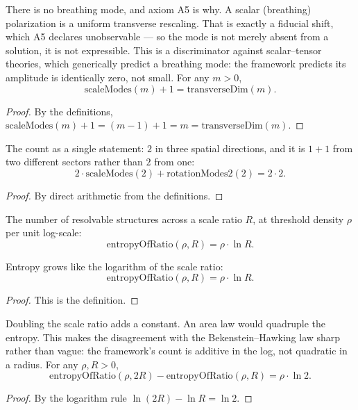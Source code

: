 \begin{theorem}
There is no breathing mode, and axiom A5 is why. A scalar (breathing) polarization is a uniform transverse rescaling. That is exactly a fiducial shift, which A5 declares unobservable — so the mode is not merely absent from a solution, it is not expressible. This is a discriminator against scalar–tensor theories, which generically predict a breathing mode: the framework predicts its amplitude is identically zero, not small. For any $m > 0$,
\[
\text{scaleModes}(m) + 1 = \text{transverseDim}(m).
\]
\begin{proof}
By the definitions, $\text{scaleModes}(m) + 1 = (m - 1) + 1 = m = \text{transverseDim}(m)$.
\end{proof}
\end{theorem}

\begin{theorem}
The count as a single statement: $2$ in three spatial directions, and it is $1 + 1$ from two different sectors rather than $2$ from one:
\[
2 \cdot \text{scaleModes}(2) + \text{rotationModes2}(2) = 2 \cdot 2.
\]
\begin{proof}
By direct arithmetic from the definitions.
\end{proof}
\end{theorem}

\begin{definition}
The number of resolvable structures across a scale ratio $R$, at threshold density $\rho$ per unit log-scale:
\[
\text{entropyOfRatio}(\rho, R) = \rho \cdot \ln R.
\]
\end{definition}

\begin{theorem}
Entropy grows like the logarithm of the scale ratio:
\[
\text{entropyOfRatio}(\rho, R) = \rho \cdot \ln R.
\]
\begin{proof}
This is the definition.
\end{proof}
\end{theorem}

\begin{theorem}
Doubling the scale ratio adds a constant. An area law would quadruple the entropy. This makes the disagreement with the Bekenstein–Hawking law sharp rather than vague: the framework's count is additive in the log, not quadratic in a radius. For any $\rho, R > 0$,
\[
\text{entropyOfRatio}(\rho, 2R) - \text{entropyOfRatio}(\rho, R) = \rho \cdot \ln 2.
\]
\begin{proof}
By the logarithm rule $\ln(2R) - \ln R = \ln 2$.
\end{proof}
\end{theorem}

